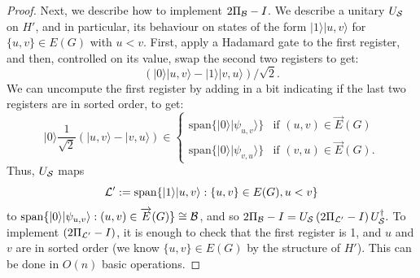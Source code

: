\documentclass{article}
\def\ket#1{{\lvert}#1\rangle}
\renewcommand{\>}{\rangle}
\newcommand{\<}{\langle}
\renewcommand{\(}{\left(}
\renewcommand{\)}{\right)}
\begin{document}
\begin{proof}
Next, we describe how to implement $2\Pi_{\cal B}-I$. We describe a unitary $U_{\cal S}$ on $H'$, and in particular, its behaviour on states of the form $\ket{1}\ket{u,v}$ for $\{u,v\}\in E(G)$ with $u<v$. First, apply a Hadamard gate to the first register, and then, controlled on its value, swap the second two registers to get:
$$\left(\ket{0}\ket{u,v} - \ket{1}\ket{v,u}\right)/\sqrt{2}.$$
We can uncompute the first register by adding in a bit indicating if the last two registers are in sorted order, to get:
$$\ket{0}\frac{1}{\sqrt{2}}\left(\ket{u,v} - \ket{v,u}\right)\in\left\{\begin{array}{ll}
\mathrm{span}\{\ket{0}\ket{\psi_{u,v}}\} & \mbox{if }(u,v)\in\overrightarrow{E}(G)\\
\mathrm{span}\{\ket{0}\ket{\psi_{v,u}}\} & \mbox{if }(v,u)\in\overrightarrow{E}(G).
\end{array}\right.$$
Thus, $U_{\cal S}$ maps
$${\cal L}':=\mathrm{span}\{\ket{1}\ket{u,v}:\{u,v\}\in E(G), u<v\}$$
to $\mathrm{span}\{\ket{0}\ket{\psi_{u,v}}:(u,v)\in\overrightarrow{E}(G)\}\cong {\cal B}$, and so 
$2\Pi_{\cal B}-I = U_{\cal S} \left(2\Pi_{{\cal L}'}  -I\right) U_{\cal S}^\dagger.$
To implement $\left(2\Pi_{{\cal L}'}  -I\right)$, it is enough to check that the first register is 1, and $u$ and $v$ are in sorted order (we know $\{u,v\}\in E(G)$ by the structure of $H'$). This can be done in $O(n)$ basic operations.
\end{proof}
\end{document}

